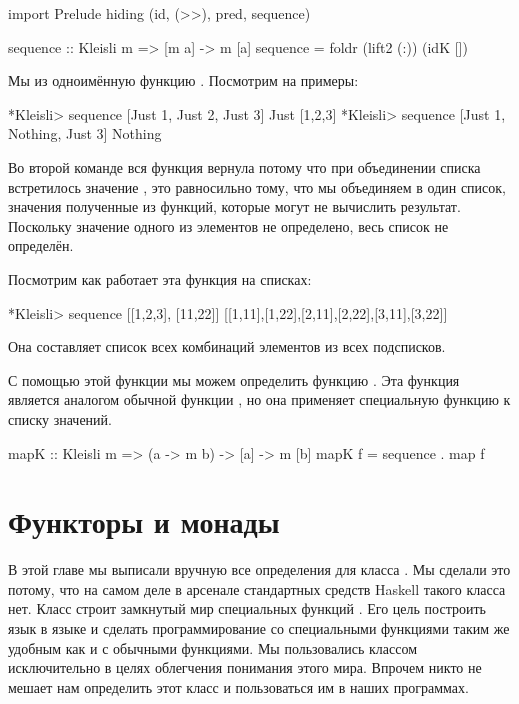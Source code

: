 \begin{code}
import Prelude hiding (id, (>>), pred, sequence)

sequence :: Kleisli m => [m a] -> m [a]
sequence = foldr (lift2 (:)) (idK []) 
\end{code}

Мы  из  одноимённую
функцию . Посмотрим на примеры:

\begin{code}
*Kleisli> sequence [Just 1, Just 2, Just 3]
Just [1,2,3]
*Kleisli> sequence [Just 1, Nothing, Just 3]
Nothing
\end{code}

Во второй команде вся функция вернула  потому что
при объединении списка встретилось значение , это
равносильно тому, что мы объединяем в один список, значения
полученные из функций, которые могут не вычислить результат. 
Поскольку значение одного из элементов не определено, весь список
не определён.

Посмотрим как работает эта функция на списках:

\begin{code}
*Kleisli> sequence [[1,2,3], [11,22]]
[[1,11],[1,22],[2,11],[2,22],[3,11],[3,22]]
\end{code}

Она составляет список всех комбинаций элементов из всех
подсписков. 

С помощью этой функции мы можем определить функцию .
Эта функция является аналогом обычной функции , но
она применяет специальную функцию к списку значений.

\begin{code}
mapK :: Kleisli m => (a -> m b) -> [a] -> m [b]
mapK f = sequence . map f
\end{code}

\section{Функторы и монады}

В этой главе мы выписали вручную все определения для
класса . Мы сделали это потому, что на самом
деле в арсенале стандартных средств Haskell такого 
класса нет. Класс  строит замкнутый 
мир специальных функций \mbox{}. Его цель построить язык 
в языке и сделать программирование со специальными функциями
таким же удобным как и с обычными функциями. 
Мы пользовались классом  исключительно в целях 
облегчения понимания этого мира. Впрочем никто не мешает
нам определить этот класс и пользоваться им в наших программах.

